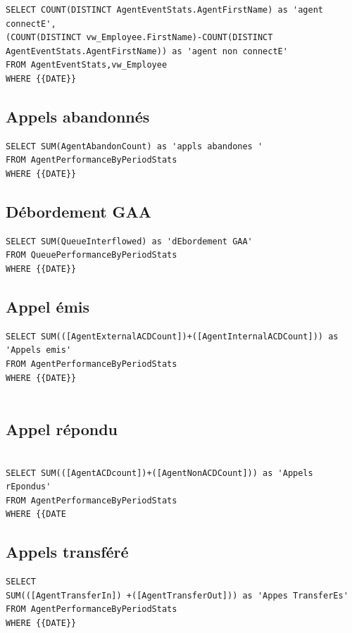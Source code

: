 \documentclass[a4paper,12pt]{report}
\begin{document}
\lstset{
language=SQL,
basicstyle=\footnotesize,
}
\begin{lstlisting}
SELECT COUNT(DISTINCT AgentEventStats.AgentFirstName) as 'agent connectE',
(COUNT(DISTINCT vw_Employee.FirstName)-COUNT(DISTINCT AgentEventStats.AgentFirstName)) as 'agent non connectE'
FROM AgentEventStats,vw_Employee
WHERE {{DATE}}     
\end{lstlisting}
       

\subsection{Appels abandonnés } 

\lstset{
language=SQL,
basicstyle=\footnotesize,
}
\begin{lstlisting}
SELECT SUM(AgentAbandonCount) as 'appls abandones '
FROM AgentPerformanceByPeriodStats
WHERE {{DATE}}  
\end{lstlisting}


\subsection{Débordement GAA} 

\lstset{
language=SQL,
basicstyle=\footnotesize,
}
\begin{lstlisting}
SELECT SUM(QueueInterflowed) as 'dEbordement GAA'
FROM QueuePerformanceByPeriodStats
WHERE {{DATE}}           
\end{lstlisting}


\subsection{Appel émis } 

\lstset{
language=SQL,
basicstyle=\footnotesize,
}
\begin{lstlisting}
SELECT SUM(([AgentExternalACDCount])+([AgentInternalACDCount])) as 'Appels emis' 
FROM AgentPerformanceByPeriodStats
WHERE {{DATE}}
       
\end{lstlisting}


\subsection{Appel répondu } 

\lstset{
language=SQL,
basicstyle=\footnotesize,
}
\begin{lstlisting}
             
SELECT SUM(([AgentACDcount])+([AgentNonACDCount])) as 'Appels rEpondus'
FROM AgentPerformanceByPeriodStats
WHERE {{DATE 
\end{lstlisting}
       
   
\subsection{Appels transféré} 

\lstset{
language=SQL,
basicstyle=\footnotesize,
}
\begin{lstlisting}
SELECT 
SUM(([AgentTransferIn]) +([AgentTransferOut])) as 'Appes TransferEs' 
FROM AgentPerformanceByPeriodStats
WHERE {{DATE}}    
\end{lstlisting}
       
\end{document}
